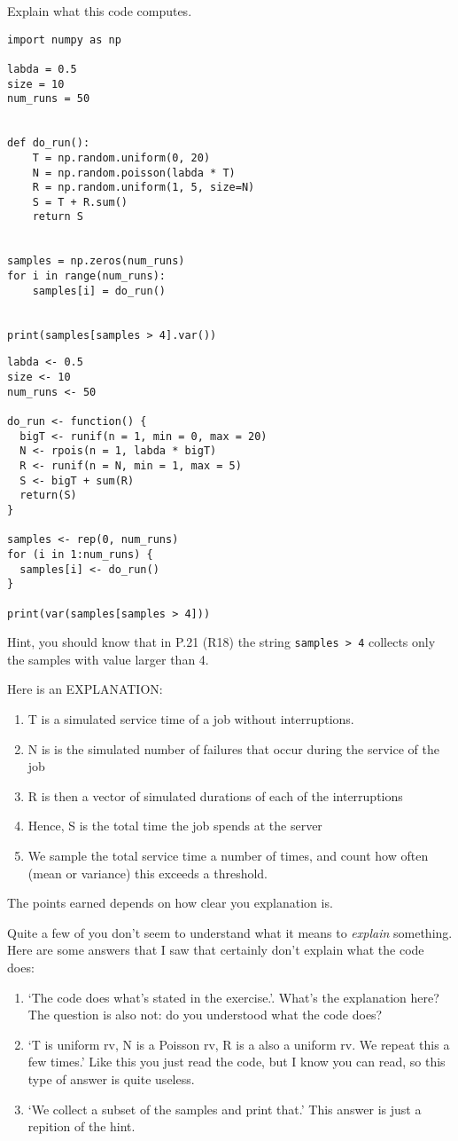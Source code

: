 \begin{exercise}[1.5]
Explain what  this code computes.
  \begin{verbatim}
import numpy as np

labda = 0.5
size = 10
num_runs = 50


def do_run():
    T = np.random.uniform(0, 20)
    N = np.random.poisson(labda * T)
    R = np.random.uniform(1, 5, size=N)
    S = T + R.sum()
    return S


samples = np.zeros(num_runs)
for i in range(num_runs):
    samples[i] = do_run()


print(samples[samples > 4].var())
  \end{verbatim}

 \begin{verbatim}
labda <- 0.5
size <- 10
num_runs <- 50

do_run <- function() {
  bigT <- runif(n = 1, min = 0, max = 20)
  N <- rpois(n = 1, labda * bigT)
  R <- runif(n = N, min = 1, max = 5)
  S <- bigT + sum(R)
  return(S)
}

samples <- rep(0, num_runs)
for (i in 1:num_runs) {
  samples[i] <- do_run()
}

print(var(samples[samples > 4]))
\end{verbatim}


Hint, you should know that in P.21 (R18) the string \verb|samples > 4| collects only the samples with value larger than 4.

\begin{solution}
Here is an EXPLANATION:
  \begin{enumerate}
  \item T is a simulated service time of a job without interruptions.
  \item N is is the simulated number of failures that occur during the service of the job
  \item R is then a vector of simulated durations of each of the interruptions
  \item Hence, S is the total time the job spends at the server
  \item We sample the total service time a number of times, and count how often (mean or variance) this exceeds a threshold.
  \end{enumerate}
The points earned depends on how clear you explanation is.


Quite a few of you don't seem to understand what it means to \emph{explain} something. Here are some answers that I saw that certainly don't explain what the code does:
  \begin{enumerate}
  \item `The code does what's stated in the exercise.'.
    What's the explanation here?
    The question is also not: do you understood what the code does?
  \item  `T is uniform rv, N is a Poisson rv, R is a also a uniform rv. We repeat this a few times.' Like this you just read the code, but I know you can read, so this type of answer is quite useless.
  \item `We collect  a subset of the samples and print that.' This answer is just a repition of the hint.
  \end{enumerate}


\end{solution}
\end{exercise}
